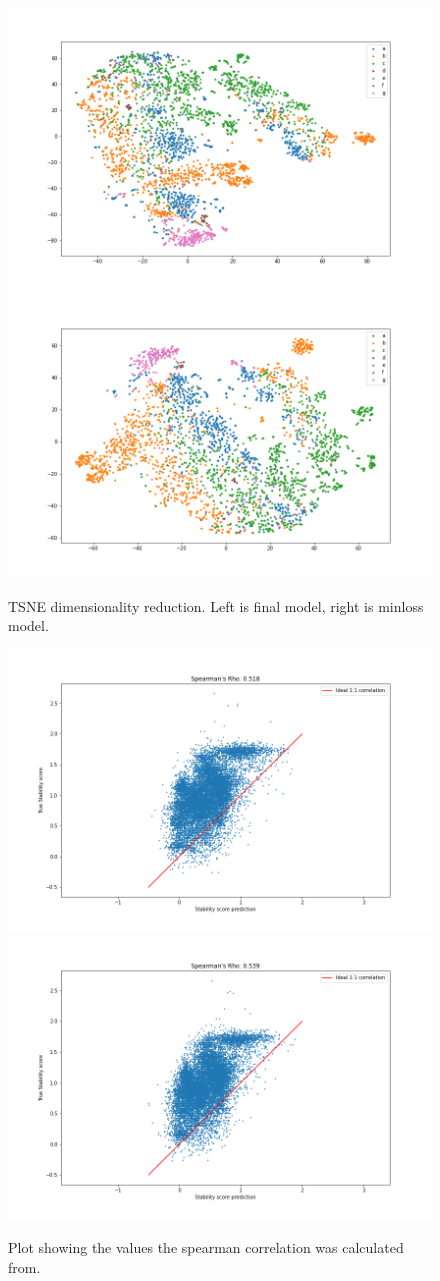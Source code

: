 \begin{figure}[!ht]
  \centering
  \includegraphics[width=0.4\linewidth]{latex/imgs/tsne_2_layer_05_drop_final.png}
  \includegraphics[width=0.4\linewidth]{latex/imgs/tsne_2_layer_05_drop_minloss.png}
  \caption{TSNE dimensionality reduction. Left is final model, right is minloss model.}
\end{figure}
\begin{figure}[!ht]
  \centering
  \includegraphics[width=0.4\linewidth]{latex/imgs/spearman_2_layer_05_drop_final.png}
  \includegraphics[width=0.4\linewidth]{latex/imgs/spearman_2_layer_05_drop_minloss.png}
  \caption{Plot showing the values the spearman correlation was calculated from.}
\end{figure}



